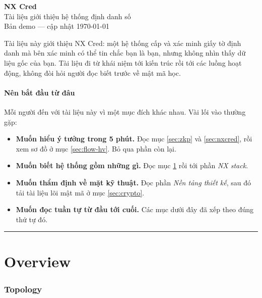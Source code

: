 \documentclass[a4paper,11pt]{article}
\newcommand{\lead}[1]{{\color{muted}\large #1}\par\medskip}
\begin{document}
\begin{center}
{\sffamily\Huge\bfseries NX Cred}\\[4pt]
{\sffamily\Large\color{muted} Tài liệu giới thiệu hệ thống định danh số}\\[10pt]
{\color{muted}\small Bản demo --- cập nhật \today}
\end{center}

\vspace{6mm}

\lead{Tài liệu này giới thiệu NX Cred: một hệ thống cấp và xác minh giấy tờ định danh mà
bên xác minh có thể tin chắc bạn là bạn, nhưng không nhìn thấy dữ liệu gốc của bạn.
Tài liệu đi từ khái niệm tới kiến trúc rồi tới các luồng hoạt động, không đòi hỏi người
đọc biết trước về mật mã học.}

\subsection*{Nên bắt đầu từ đâu}

Mỗi người đến với tài liệu này vì một mục đích khác nhau. Vài lối vào thường gặp:

\begin{itemize}[leftmargin=1.2em,itemsep=4pt]
  \item \textbf{Muốn hiểu ý tưởng trong 5 phút.} Đọc mục \ref{sec:zkp} và \ref{sec:nxcred},
        rồi xem sơ đồ ở mục \ref{sec:flow-hv}. Bỏ qua phần còn lại.
  \item \textbf{Muốn biết hệ thống gồm những gì.} Đọc mục \ref{sec:topology} rồi tới
        phần \textit{NX stack}.
  \item \textbf{Muốn thẩm định về mặt kỹ thuật.} Đọc phần \textit{Nền tảng thiết kế},
        sau đó tải tài liệu lõi mật mã ở mục \ref{sec:crypto}.
  \item \textbf{Muốn đọc tuần tự từ đầu tới cuối.} Các mục dưới đây đã xếp theo đúng
        thứ tự đó.
\end{itemize}

\vspace{2mm}
\hrule
\vspace{6mm}

\part*{\sffamily Overview}

\section{Topology}
\label{sec:topology}
\end{document}

